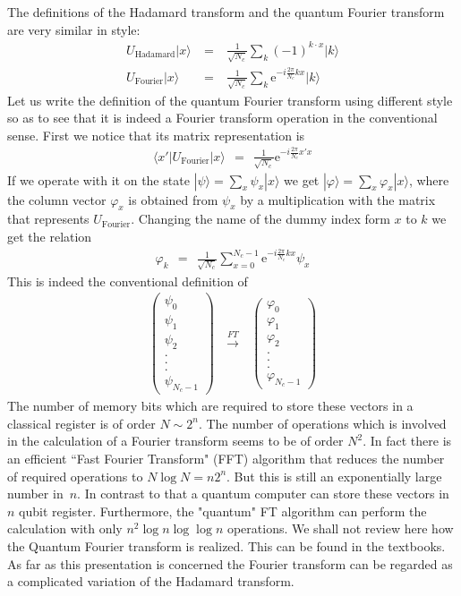 \documentclass[onecolumn,fleqn]{revtex4}
\newcommand{\eexp}{\mathrm{e}^}
\newcommand{\tbox}[1]{\text{#1}}
\newcommand{\beq}{\begin{eqnarray}}
\newcommand{\eeq}{\end{eqnarray}}
\begin{document}
The definitions of the Hadamard transform 
and the quantum Fourier transform are very similar in style:
\beq
U_{\tbox{Hadamard}}|x\rangle 
\ &=& \ \frac{1}{\sqrt{N_c}} \sum_k (-1)^{k\cdot x}|k\rangle
\\
U_{\tbox{Fourier}}|x\rangle 
\ &=& \ \frac{1}{\sqrt{N_c}} \sum_k \eexp{-i\frac{2\pi}{N_c}kx}|k\rangle
\eeq
Let us write the definition of the quantum Fourier transform
using different style so as to see that it is indeed a Fourier 
transform operation in the conventional sense. 
First we notice that its matrix representation is 
\beq
\langle x' |U_{\tbox{Fourier}}| x \rangle 
\ \ = \ \ \frac{1}{\sqrt{N_c}}  \eexp{-i \frac {2\pi}{N_c} x' x}
\eeq
If we operate with it 
on the state  $|\psi\rangle = \sum_x \psi_x |x\rangle$
we get $|\varphi \rangle = \sum_x \varphi_x |x\rangle$, 
where the column vector $\varphi_x$ is obtained from $\psi_x$ by 
a multiplication with the matrix that represents $U_{\tbox{Fourier}}$. 
Changing the name of the dummy index form $x$ to $k$ we get     
the relation
\beq
\varphi_k \ \ = \ \ \frac{1}{\sqrt{N_c}} \sum_{x=0}^{N_c-1} \eexp{-i \frac {2\pi}{N_c} kx} \psi_x
\eeq
This is indeed the conventional definition of 
\beq
\left( 
\begin{array}{c} 
\psi_0 \\ \psi_1 \\ \psi_2 \\ . \\ . \\ . \\ \psi_{N_c-1} 
\end{array} \right)
\ \ \ \overset{FT}{\longrightarrow} \ \ \ 
\left( 
\begin{array}{c} 
\varphi_0 \\ \varphi_1 \\ \varphi_2 \\ . \\ . \\ . \\ \varphi_{N_c-1} 
\end{array} \right)
\eeq
The number of memory bits which are required 
to store these vectors in a classical register 
is of order $N \sim 2^n$.  
The number of operations which is involved in 
the calculation of a Fourier transform  
seems to be of order $N^2$. 
In fact there is an efficient 
``Fast Fourier Transform" (FFT) algorithm that 
reduces the number of required operations to $N\log N = n2^n$. 
But this is still an exponentially large number in~$n$. 
In contrast to that a quantum computer can store  
these vectors in $n$ qubit register. Furthermore,  
the "quantum" FT algorithm can perform the calculation  
with only $n^2 \log n \log \log n$ operations. 
We shall not review here how the Quantum Fourier transform 
is realized. This can be found in the textbooks. 
As far as this presentation is concerned 
the Fourier transform can be regarded 
as a complicated variation of the Hadamard transform. 
\end{document}
